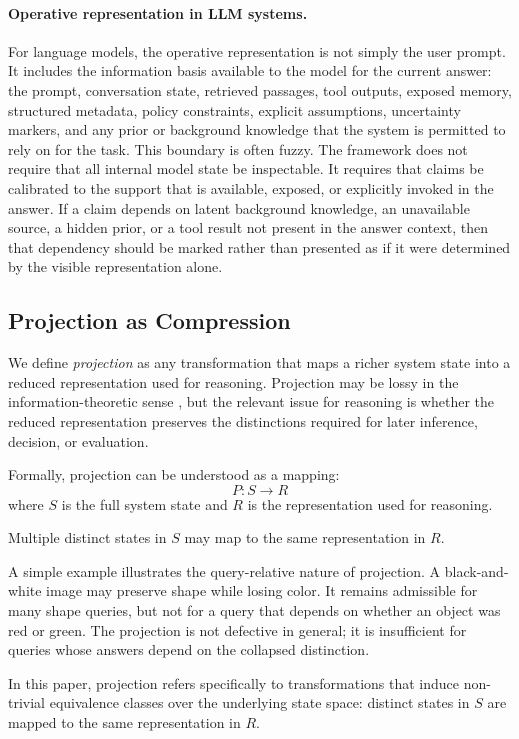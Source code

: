 \documentclass[11pt]{article}
\begin{document}
\paragraph{Operative representation in LLM systems.}
For language models, the operative representation is not simply the user prompt. It includes the information basis available to the model for the current answer: the prompt, conversation state, retrieved passages, tool outputs, exposed memory, structured metadata, policy constraints, explicit assumptions, uncertainty markers, and any prior or background knowledge that the system is permitted to rely on for the task. This boundary is often fuzzy. The framework does not require that all internal model state be inspectable. It requires that claims be calibrated to the support that is available, exposed, or explicitly invoked in the answer. If a claim depends on latent background knowledge, an unavailable source, a hidden prior, or a tool result not present in the answer context, then that dependency should be marked rather than presented as if it were determined by the visible representation alone.

\subsection{Projection as Compression}

We define \emph{projection} as any transformation that maps a richer system state into a reduced representation used for reasoning. Projection may be lossy in the information-theoretic sense \cite{Shannon1948}, but the relevant issue for reasoning is whether the reduced representation preserves the distinctions required for later inference, decision, or evaluation.

Formally, projection can be understood as a mapping:
\[
P: S \rightarrow R
\]
where $S$ is the full system state and $R$ is the representation used for reasoning.

Multiple distinct states in $S$ may map to the same representation in $R$.

A simple example illustrates the query-relative nature of projection. A black-and-white image may preserve shape while losing color. It remains admissible for many shape queries, but not for a query that depends on whether an object was red or green. The projection is not defective in general; it is insufficient for queries whose answers depend on the collapsed distinction.

In this paper, projection refers specifically to transformations that induce non-trivial equivalence classes over the underlying state space: distinct states in $S$ are mapped to the same representation in $R$.
\end{document}
